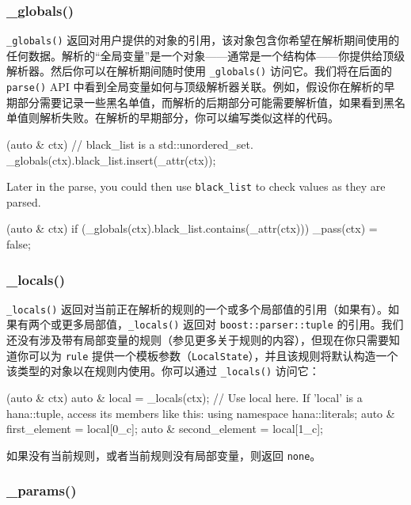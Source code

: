 \subsubsection{\_globals()}

\texttt{\_globals()} 返回对用户提供的对象的引用，该对象包含你希望在解析期间使用的任何数据。解析的“全局变量”是一个对象——通常是一个结构体——你提供给顶级解析器。然后你可以在解析期间随时使用 \texttt{\_globals()} 访问它。我们将在后面的 \texttt{parse()} API 中看到全局变量如何与顶级解析器关联。例如，假设你在解析的早期部分需要记录一些黑名单值，而解析的后期部分可能需要解析值，如果看到黑名单值则解析失败。在解析的早期部分，你可以编写类似这样的代码。

\begin{code}
[](auto & ctx) {
    // black_list is a std::unordered_set.
    _globals(ctx).black_list.insert(_attr(ctx));
}
\end{code}

Later in the parse, you could then use \texttt{black\_list} to check values as they are parsed.

\begin{code}
[](auto & ctx) {
    if (_globals(ctx).black_list.contains(_attr(ctx)))
        _pass(ctx) = false;
}
\end{code}

\subsubsection{\_locals()}

\texttt{\_locals()} 返回对当前正在解析的规则的一个或多个局部值的引用（如果有）。如果有两个或更多局部值，\texttt{\_locals()} 返回对 \texttt{boost::parser::tuple} 的引用。我们还没有涉及带有局部变量的规则（参见更多关于规则的内容），但现在你只需要知道你可以为 \texttt{rule} 提供一个模板参数（\texttt{LocalState}），并且该规则将默认构造一个该类型的对象以在规则内使用。你可以通过 \texttt{\_locals()} 访问它：

\begin{code}
[](auto & ctx) {
    auto & local = _locals(ctx);
    // Use local here.  If 'local' is a hana::tuple, access its members like this:
    using namespace hana::literals;
    auto & first_element = local[0_c];
    auto & second_element = local[1_c];
}
\end{code}

如果没有当前规则，或者当前规则没有局部变量，则返回 \texttt{none}。

\subsubsection{\_params()}

